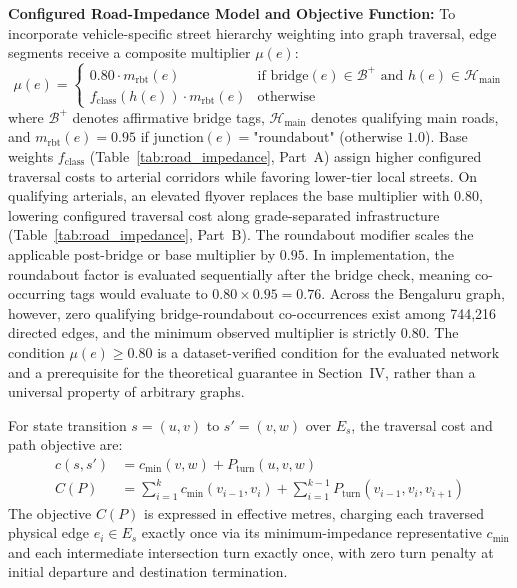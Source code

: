 \documentclass[conference]{IEEEtran}
\begin{document}
\noindent\textbf{Configured Road-Impedance Model and Objective Function:} To incorporate vehicle-specific street hierarchy weighting into graph traversal, edge segments receive a composite multiplier $\mu(e)$:
\begin{equation}
\label{eq:road_impedance}
\mu(e) = \begin{cases}
0.80 \cdot m_{\text{rbt}}(e) & \text{if } \text{bridge}(e) \in \mathcal{B}^+ \text{ and } h(e) \in \mathcal{H}_{\text{main}} \\
f_{\text{class}}(h(e)) \cdot m_{\text{rbt}}(e) & \text{otherwise}
\end{cases}
\end{equation}
where $\mathcal{B}^+$ denotes affirmative bridge tags, $\mathcal{H}_{\text{main}}$ denotes qualifying main roads, and $m_{\text{rbt}}(e) = 0.95$ if $\text{junction}(e) = \text{"roundabout"}$ (otherwise $1.0$). Base weights $f_{\text{class}}$ (Table~\ref{tab:road_impedance}, Part~A) assign higher configured traversal costs to arterial corridors while favoring lower-tier local streets. On qualifying arterials, an elevated flyover replaces the base multiplier with $0.80$, lowering configured traversal cost along grade-separated infrastructure (Table~\ref{tab:road_impedance}, Part~B). The roundabout modifier scales the applicable post-bridge or base multiplier by $0.95$. In implementation, the roundabout factor is evaluated sequentially after the bridge check, meaning co-occurring tags would evaluate to $0.80 \times 0.95 = 0.76$. Across the Bengaluru graph, however, zero qualifying bridge-roundabout co-occurrences exist among 744,216 directed edges, and the minimum observed multiplier is strictly $0.80$. The condition $\mu(e) \ge 0.80$ is a dataset-verified condition for the evaluated network and a prerequisite for the theoretical guarantee in Section~IV, rather than a universal property of arbitrary graphs.

For state transition $s = (u, v)$ to $s' = (v, w)$ over $E_s$, the traversal cost and path objective are:
\begin{equation}
\label{eq:path_objective}
\begin{aligned}
c(s, s') &= c_{\min}(v, w) + P_{\text{turn}}(u, v, w) \\
C(P) &= \sum_{i=1}^k c_{\min}(v_{i-1}, v_i) + \sum_{i=1}^{k-1} P_{\text{turn}}(v_{i-1}, v_i, v_{i+1})
\end{aligned}
\end{equation}
The objective $C(P)$ is expressed in effective metres, charging each traversed physical edge $e_i \in E_s$ exactly once via its minimum-impedance representative $c_{\min}$ and each intermediate intersection turn exactly once, with zero turn penalty at initial departure and destination termination.
\end{document}

